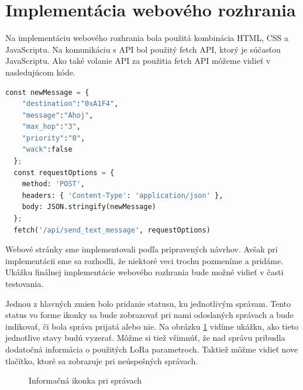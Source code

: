 \documentclass[slovak,master]{diploma}
\begin{document}
\section{Implementácia webového rozhrania}
Na implementáciu webového rozhrania bola použitá kombinácia HTML, CSS a JavaScriptu. Na komunikáciu s API bol použitý fetch API, 
ktorý je súčasťou JavaScriptu. Ako také volanie API za použitia fetch API môžeme vidieť v nasledujúcom kóde.

\begin{lstlisting}[language=Python, label={lst:fetch}]
  const newMessage = {
    "destination":"0xA1F4",
    "message":"Ahoj",
    "max_hop":"3",
    "priority":"0",
    "wack":false
  };
  const requestOptions = {
    method: 'POST',
    headers: { 'Content-Type': 'application/json' },
    body: JSON.stringify(newMessage)
  };
  fetch('/api/send_text_message', requestOptions)
\end{lstlisting}

Webové stránky sme implementovali podľa pripravených návrhov. Avšak pri implementácii sme sa rozhodli, že 
niektoré veci trochu pozmeníme a pridáme. Ukážku finálnej implementácie webového rozhrania bude možné vidieť v časti testovania.

Jednou z hlavných zmien bolo pridanie statusu, ku jednotlivým správam. 
Tento status vo forme ikonky sa bude zobrazovať pri nami odoslaných správach a bude indikovať, či bola správa prijatá alebo nie. 
Na obrázku \ref{fig:messageStates} vidíme ukážku, ako tieto jednotlive stavy budú vyzerať. Môžme si tiež všimnúť, že nad správu 
pribudla dodatočná informácia o použitých LoRa parametroch. Taktiež môžme vidieť nove tlačítko, ktoré sa zobrazuje pri 
neúspešných správach.

\begin{figure}[h!]
  \centering
  \newline
  \caption{Informačná ikonka pri správach}
  \label{fig:messageStates}
\end{figure}
\end{document}
